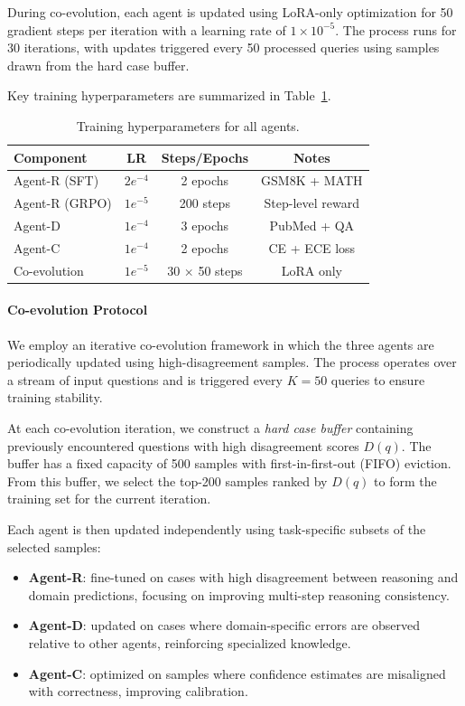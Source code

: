 \documentclass{article}
\begin{document}
During co-evolution, each agent is updated using LoRA-only optimization for 50 gradient steps per iteration with a learning rate of $1 \times 10^{-5}$. The process runs for 30 iterations, with updates triggered every 50 processed queries using samples drawn from the hard case buffer.

Key training hyperparameters are summarized in Table~\ref{tab:training}.

\begin{table}[h]
\centering
\caption{Training hyperparameters for all agents.}
\label{tab:training}
\begin{tabular}{lccc}
\toprule
\textbf{Component} & \textbf{LR} & \textbf{Steps/Epochs} & \textbf{Notes} \\
\midrule
Agent-R (SFT) & $2e^{-4}$ & 2 epochs & GSM8K + MATH \\
Agent-R (GRPO) & $1e^{-5}$ & 200 steps & Step-level reward \\
Agent-D & $1e^{-4}$ & 3 epochs & PubMed + QA \\
Agent-C & $1e^{-4}$ & 2 epochs & CE + ECE loss \\
Co-evolution & $1e^{-5}$ & 30 $\times$ 50 steps & LoRA only \\
\bottomrule
\end{tabular}
\end{table}
\paragraph{Co-evolution Protocol}
We employ an iterative co-evolution framework in which the three agents are periodically updated using high-disagreement samples. The process operates over a stream of input questions and is triggered every $K=50$ queries to ensure training stability.

At each co-evolution iteration, we construct a \textit{hard case buffer} containing previously encountered questions with high disagreement scores $D(q)$. The buffer has a fixed capacity of 500 samples with first-in-first-out (FIFO) eviction. From this buffer, we select the top-200 samples ranked by $D(q)$ to form the training set for the current iteration.

Each agent is then updated independently using task-specific subsets of the selected samples:
\begin{itemize}
    \item \textbf{Agent-R}: fine-tuned on cases with high disagreement between reasoning and domain predictions, focusing on improving multi-step reasoning consistency.
    \item \textbf{Agent-D}: updated on cases where domain-specific errors are observed relative to other agents, reinforcing specialized knowledge.
    \item \textbf{Agent-C}: optimized on samples where confidence estimates are misaligned with correctness, improving calibration.
\end{itemize}
\end{document}
